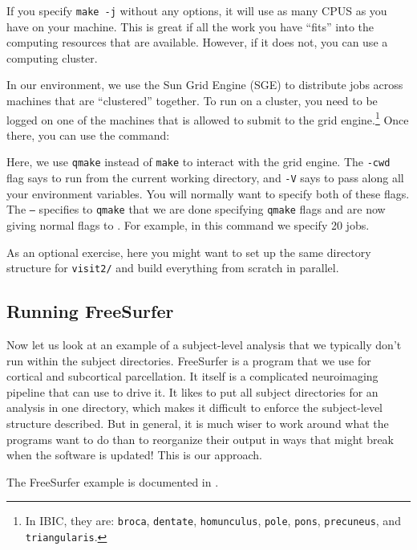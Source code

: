 If you specify \texttt{make -j} without any options, it will use as many CPUS as  you have on your machine. This is great if all the work you have ``fits'' into the computing resources that are available. However, if it does not, you can use a computing cluster.

In our environment, we use the Sun Grid Engine (SGE) to distribute
jobs across machines that are ``clustered'' together. To run on a
cluster, you need to be logged on one of the machines that is allowed
to submit to the grid engine.\footnote{In IBIC, they are:  \texttt{broca}, \texttt{dentate}, \texttt{homunculus}, \texttt{pole}, \texttt{pons}, \texttt{precuneus}, and \texttt{triangularis}.} Once there, you can use the command:

Here, we use \texttt{qmake} instead of \texttt{make} to interact with the grid engine. The \texttt{-cwd} flag says to run from the current working directory, and \texttt{-V} says to pass along all your environment variables. You will normally want to specify both of these flags. The \texttt{--} specifies to \texttt{qmake} that we are done specifying \texttt{qmake} flags and are now giving normal flags to \maken{}. For example, in this command we specify 20 jobs. 

As an optional exercise, here you might want to set up the same directory structure for \texttt{visit2/} and build everything from scratch in parallel.

\subsection{Running FreeSurfer}
Now let us look at an example of a subject-level analysis that we
typically don't run within the subject directories. FreeSurfer
\citep[see][]{Desikan2006968, Fischl01012004, Fischl2004S69} is a
program that we use for cortical and subcortical parcellation. It
itself is a complicated neuroimaging pipeline that can use \maken{} to
drive it. It likes to put all subject directories for an analysis in one directory, which makes it difficult to enforce the subject-level structure described. But in general, it is much wiser to work around what the programs want to do than to reorganize their output in ways that might break when the software is updated! This is our approach.

The FreeSurfer example is documented in . 

